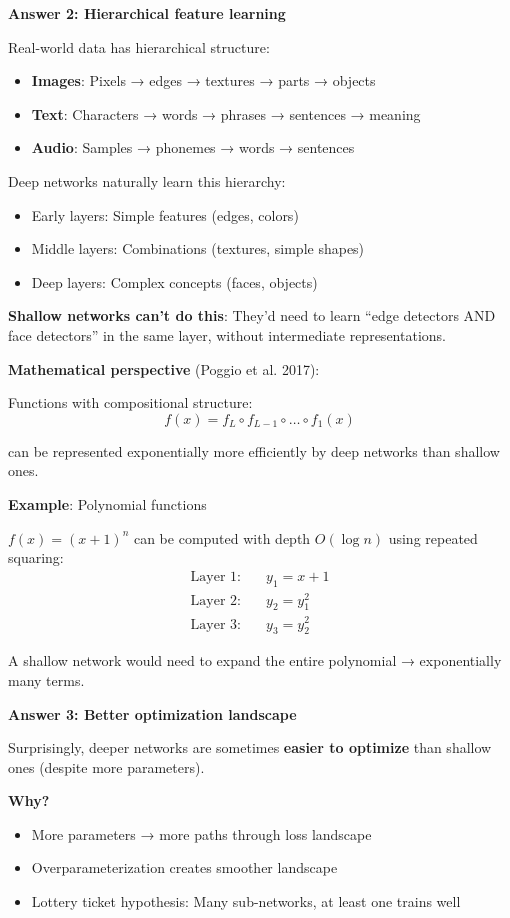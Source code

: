 \documentclass[11pt,oneside]{book}
\begin{document}
\textbf{Answer 2: Hierarchical feature learning}

Real-world data has hierarchical structure:
\begin{itemize}
\item \textbf{Images}: Pixels → edges → textures → parts → objects
\item \textbf{Text}: Characters → words → phrases → sentences → meaning
\item \textbf{Audio}: Samples → phonemes → words → sentences
\end{itemize}

Deep networks naturally learn this hierarchy:
\begin{itemize}
\item Early layers: Simple features (edges, colors)
\item Middle layers: Combinations (textures, simple shapes)
\item Deep layers: Complex concepts (faces, objects)
\end{itemize}

\textbf{Shallow networks can't do this}: They'd need to learn ``edge detectors AND face detectors'' in the same layer, without intermediate representations.

\textbf{Mathematical perspective} (Poggio et al. 2017):

Functions with compositional structure:
\[
f(x) = f_L \circ f_{L-1} \circ \ldots \circ f_1(x)
\]

can be represented exponentially more efficiently by deep networks than shallow ones.

\textbf{Example}: Polynomial functions

$f(x) = (x + 1)^n$ can be computed with depth $O(\log n)$ using repeated squaring:
\begin{align*}
\text{Layer 1:} \quad & y_1 = x + 1 \\
\text{Layer 2:} \quad & y_2 = y_1^2 \\
\text{Layer 3:} \quad & y_3 = y_2^2
\end{align*}

A shallow network would need to expand the entire polynomial → exponentially many terms.

\textbf{Answer 3: Better optimization landscape}

Surprisingly, deeper networks are sometimes \textbf{easier to optimize} than shallow ones (despite more parameters).

\textbf{Why?}
\begin{itemize}
\item More parameters → more paths through loss landscape
\item Overparameterization creates smoother landscape
\item Lottery ticket hypothesis: Many sub-networks, at least one trains well
\end{itemize}
\end{document}
